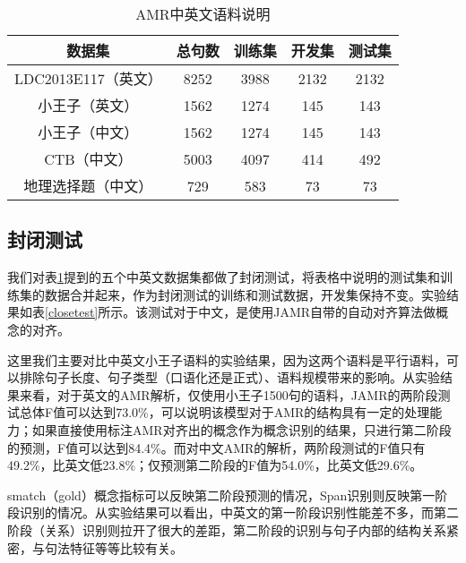 \documentclass[master, winfont]{njuthesis}
\begin{document}
\begin{table}[!htbp]
\begin{center}
\begin{tabular}{c|c|c|c|c}
\hline {数据集} & {总句数} & {训练集} & {开发集} & {测试集} \\
\hline LDC2013E117（英文） & 8252 & 3988 & 2132 & 2132 \\
\hline 小王子（英文） & 1562 & 1274 & 145 & 143 \\
\hline 小王子（中文） & 1562 & 1274 & 145 & 143 \\
\hline CTB（中文） & 5003 & 4097 & 414 & 492 \\
\hline 地理选择题（中文） & 729 & 583 & 73 & 73 \\
\hline
\end{tabular}
\end{center}
\caption{\label{amrdatas} AMR中英文语料说明}
\end{table}

\subsection{封闭测试}
我们对表\ref{amrdatas}提到的五个中英文数据集都做了封闭测试，将表格中说明的测试集和训练集的数据合并起来，作为封闭测试的训练和测试数据，开发集保持不变。实验结果如表\ref{closetest}所示。该测试对于中文，是使用JAMR自带的自动对齐算法做概念的对齐。

这里我们主要对比中英文小王子语料的实验结果，因为这两个语料是平行语料，可以排除句子长度、句子类型（口语化还是正式）、语料规模带来的影响。从实验结果来看，对于英文的AMR解析，仅使用小王子1500句的语料，JAMR的两阶段测试总体F值可以达到73.0\%，可以说明该模型对于AMR的结构具有一定的处理能力；如果直接使用标注AMR对齐出的概念作为概念识别的结果，只进行第二阶段的预测，F值可以达到84.4\%。而对中文AMR的解析，两阶段测试的F值只有49.2\%，比英文低23.8\%；仅预测第二阶段的F值为54.0\%，比英文低29.6\%。

smatch（gold）概念指标可以反映第二阶段预测的情况，Span识别则反映第一阶段识别的情况。从实验结果可以看出，中英文的第一阶段识别性能差不多，而第二阶段（关系）识别则拉开了很大的差距，第二阶段的识别与句子内部的结构关系紧密，与句法特征等等比较有关。
\end{document}
